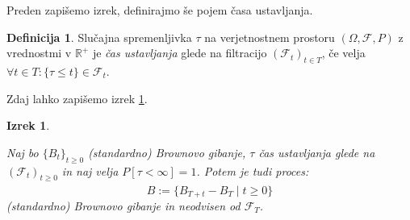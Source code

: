 \documentclass[11pt]{article}
\theoremstyle{plain}
\newtheorem{izrek}{Izrek}
\theoremstyle{definition}
\newtheorem{definicija}{Definicija}
\newcommand{\f}{\mathcal{F}}
\begin{document}
    Preden zapišemo izrek, definirajmo še pojem časa ustavljanja.
    
    \begin{definicija}
    Slučajna spremenljivka $\tau$ na verjetnostnem prostoru $ (\Omega, \f, P )$ z vrednostmi v $\mathbb{R}^{+}$
    je \textit{čas ustavljanja} glede na filtracijo $ (\f_t )_{t \in T} $, če velja $\forall t \in T:\{\tau \leq t\} \in \f_t $.
    \end{definicija}
    
    Zdaj lahko zapišemo izrek \ref{thm:stopped_brownian}. %
    
    \begin{izrek}
        \label{thm:stopped_brownian}
        
    Naj bo $\{B_t\}_{t \geq 0}$ (standardno) Brownovo gibanje, $\tau$ čas ustavljanja glede na 
    $ (\f_t )_{t \geq 0}$ in naj velja $P[\tau < \infty] =1$.
    Potem je tudi proces:
    \[
    \hat{B} := \{B_{T+t} - B_T \mid t \geq 0\}
    \]
    (standardno) Brownovo gibanje in neodvisen od $\f_T$.
    
    \end{izrek}

    
    
\end{document}
